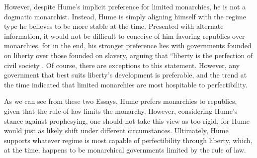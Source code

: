 \documentclass[authordate]{turabian-researchpaper}
\begin{document}
However, despite Hume’s implicit preference for limited monarchies, he is not a dogmatic monarchist. Instead, Hume is simply aligning himself with the regime type he believes to be more stable at the time. Presented with alternate information, it would not be difficult to conceive of him favoring republics over monarchies, for in the end, his stronger preference lies with governments founded on liberty over those founded on slavery, arguing that “liberty is the perfection of civil society .\autocite[47]{Hume_1985} Of course, there are exceptions to this statement. However, any government that best suits liberty’s development is preferable, and the trend at the time indicated that limited monarchies are most hospitable to perfectibility. 

As we can see from these two Essays, Hume prefers monarchies to republics, given that the rule of law limits the monarchy. However, considering Hume’s stance against prophesying, one should not take this view as too rigid, for Hume would just as likely shift under different circumstances. Ultimately, Hume supports whatever regime is most capable of perfectibility through liberty, which, at the time, happens to be monarchical governments limited by the rule of law. 

\clearpage
\printbibliography
\end{document}
